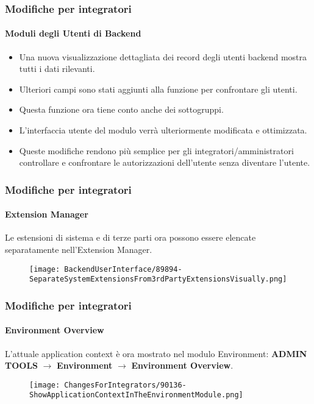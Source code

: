 
\begin{frame}[fragile]
	\frametitle{Modifiche per integratori}
	\framesubtitle{Moduli degli Utenti di Backend}

	\begin{itemize}
		\item Una nuova visualizzazione dettagliata dei record degli utenti backend mostra tutti i dati rilevanti.
		\item Ulteriori campi sono stati aggiunti alla funzione per confrontare gli utenti.
		\item Questa funzione ora tiene conto anche dei sottogruppi.
		\item L'interfaccia utente del modulo verrà ulteriormente modificata e ottimizzata.
		\item Queste modifiche rendono più semplice per gli integratori/amministratori controllare e confrontare
		    le autorizzazioni dell'utente senza diventare l'utente.
	\end{itemize}

\end{frame}


\begin{frame}[fragile]
	\frametitle{Modifiche per integratori}
	\framesubtitle{Extension Manager}

	Le estensioni di sistema e di terze parti ora possono essere elencate separatamente nell'Extension Manager.

	\begin{figure}
		\texttt{[image: BackendUserInterface/89894-SeparateSystemExtensionsFrom3rdPartyExtensionsVisually.png]}
	\end{figure}

\end{frame}


\begin{frame}[fragile]
	\frametitle{Modifiche per integratori}
	\framesubtitle{Environment Overview}

	L'attuale application context è ora mostrato nel modulo Environment:\newline
	\textbf{ADMIN TOOLS} $\rightarrow$ \textbf{Environment} $\rightarrow$ \textbf{Environment Overview}.

	\begin{figure}
		\texttt{[image: ChangesForIntegrators/90136-ShowApplicationContextInTheEnvironmentModule.png]}
	\end{figure}

\end{frame}

